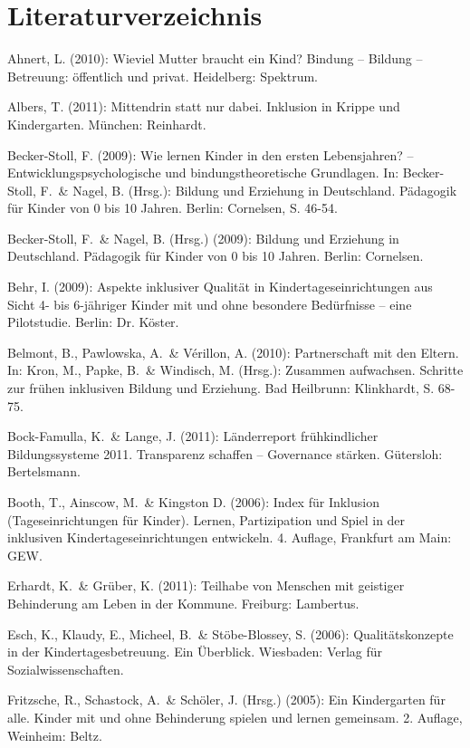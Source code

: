 \chapter*{Literaturverzeichnis}

Ahnert, L. (2010): Wieviel Mutter braucht ein Kind? Bindung – Bildung – Betreuung: öffentlich und privat. Heidelberg: Spektrum.

Albers, T. (2011): Mittendrin statt nur dabei. Inklusion in Krippe und Kindergarten. München: Reinhardt.

Becker-Stoll, F. (2009): Wie lernen Kinder in den ersten Lebensjahren? – Entwicklungspsychologische und bindungstheoretische Grundlagen. In: Becker-Stoll, F.~\& Nagel, B. (Hrsg.): Bildung und Erziehung in Deutschland. Pädagogik für Kinder von 0 bis 10 Jahren. Berlin: Cornelsen, S. 46-54.

Becker-Stoll, F.~\& Nagel, B. (Hrsg.) (2009): Bildung und Erziehung in Deutschland. Pädagogik für Kinder von 0 bis 10 Jahren. Berlin: Cornelsen. 

Behr, I. (2009): Aspekte inklusiver Qualität in Kindertageseinrichtungen aus Sicht 4- bis 6-jähriger Kinder mit und ohne besondere Bedürfnisse – eine Pilotstudie. Berlin: Dr. Köster.

Belmont, B., Pawlowska, A.~\& Vérillon, A. (2010):
Partnerschaft mit den Eltern. In: Kron, M., Papke, B.~\& Windisch, M. (Hrsg.): Zusammen aufwachsen. Schritte zur frühen inklusiven Bildung und Erziehung. Bad Heilbrunn: Klinkhardt, S. 68-75.

Bock-Famulla, K.~\& Lange, J. (2011): Länderreport frühkindlicher Bildungssysteme 2011. Transparenz schaffen – Governance stärken.
Gütersloh: Bertelsmann.

Booth, T., Ainscow, M.~\& Kingston D. (2006): Index für Inklusion (Tageseinrichtungen für Kinder). Lernen, Partizipation und Spiel in der inklusiven Kindertageseinrichtungen entwickeln. 4. Auflage, Frankfurt am Main: GEW. 

Erhardt, K.~\& Grüber, K. (2011): Teilhabe von Menschen mit geistiger Behinderung am Leben in der Kommune. Freiburg: Lambertus.

Esch, K., Klaudy, E., Micheel, B.~\& Stöbe-Blossey, S. (2006): Qualitätskonzepte in der Kindertagesbetreuung. Ein Überblick. Wiesbaden: Verlag für Sozialwissenschaften.

Fritzsche, R., Schastock, A.~\& Schöler, J. (Hrsg.) (2005): Ein Kindergarten für alle. Kinder mit und ohne Behinderung spielen und lernen gemeinsam. 2. Auflage, Weinheim: Beltz. 


